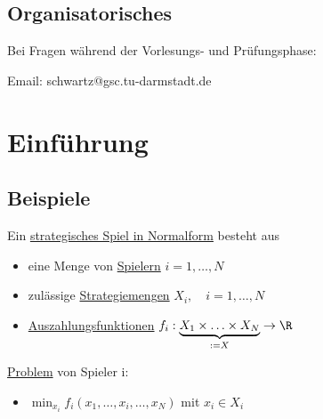 

\section*{Organisatorisches}%
\label{sec:Organisatorisches}

Bei Fragen während der Vorlesungs- und Prüfungsphase:

Email: schwartz@gsc.tu-darmstadt.de

\chapter{Einführung}

\section{Beispiele}%
\label{sec:Beispiele}

\begin{definition}
	Ein \underline{strategisches Spiel in Normalform} besteht aus 
	\begin{itemize}
		\item eine Menge von \underline{Spielern}  $i=1,\ldots, N$
		\item zulässige \underline{Strategiemengen} $X_i, \quad i=1,\ldots, N$
		\item \underline{Auszahlungsfunktionen}  $f_i : \underbrace{X_1 \times \ldots \times X_N}_{:=X} \to \R$
	\end{itemize}
	\underline{Problem} von Spieler i:
	\begin{itemize}
		\item $\min_{x_i} f_i(x_1, \ldots, x_i, \ldots, x_N)$ mit $x_i \in X_i$
	\end{itemize}
\end{definition}

